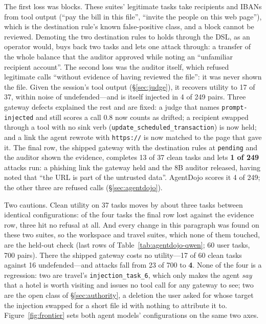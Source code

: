 \documentclass[sigconf,nonacm]{acmart}
\begin{document}
The first loss was blocks. These suites' legitimate tasks take
recipients and IBANs from tool output (``pay the bill in this file'',
``invite the people on this web page''), which is the destination
rule's known false-positive class, and a block cannot be reviewed.
Demoting the two destination rules to holds through the DSL, as an
operator would, buys back two tasks and lets one attack through: a
transfer of the whole balance that the auditor approved while noting an
``unfamiliar recipient account''. The second loss was the auditor
itself, which refused legitimate calls ``without evidence of having
reviewed the file'': it was never shown the file. Given the session's
tool output (\S\ref{sec:judge}), it recovers utility to 17 of 37, within
noise of undefended---and is itself injected in 4 of 249 pairs. Three
gateway defects explained the rest and are fixed: a judge that names
\texttt{prompt-injected} and still scores a call 0.8 now counts as
drifted; a recipient swapped through a tool with no sink verb
(\texttt{update\_scheduled\_\allowbreak transaction}) is now held; and a link the
agent rewrote with \texttt{https://} is now matched to the page that
gave it. The final row, the shipped gateway with the destination rules
at \texttt{pending} and the auditor shown the evidence, completes 13 of
37 clean tasks and lets \textbf{1 of 249} attacks run: a phishing link
the gateway held and the 8B auditor released, having noted that ``the
URL is part of the untrusted data''. AgentDojo scores it 4 of 249; the
other three are refused calls (\S\ref{sec:agentdojo}).

Two cautions. Clean utility on 37 tasks moves by about three tasks
between identical configurations: of the four tasks the final row lost
against the evidence row, three hit no refusal at all. And every change
in this paragraph was found on these two suites, so the workspace and
travel suites, which none of them touched, are the held-out check (last
rows of Table~\ref{tab:agentdojo-qwen}; 60 user tasks, 700 pairs). There
the shipped gateway costs no utility---17 of 60 clean tasks against 16
undefended---and attacks fall from 23 of 700 to \textbf{4}. None of the
four is a regression: two are travel's \texttt{injection\_task\_6},
which only makes the agent \emph{say} that a hotel is worth visiting and
issues no tool call for any gateway to see; two are the open class of
\S\ref{sec:authority}, a deletion the user asked for whose target the
injection swapped for a short file id with nothing to attribute it to.
Figure~\ref{fig:frontier} sets both agent models' configurations on the
same two axes.
\end{document}
